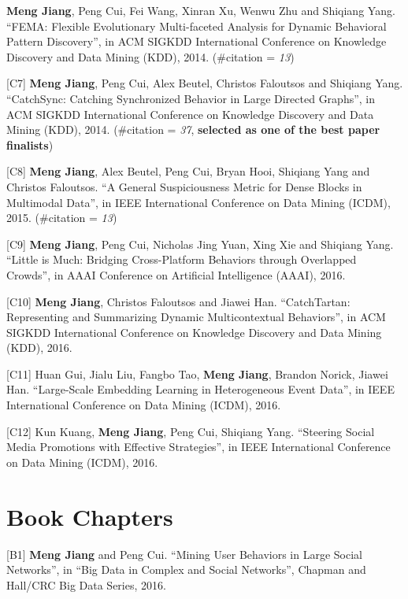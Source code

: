 \documentclass[margin, 10pt]{res}
\begin{document}
\begin{resume}
[C6] \textbf{Meng Jiang}, Peng Cui, Fei Wang, Xinran Xu, Wenwu Zhu and Shiqiang Yang. ``FEMA: Flexible Evolutionary Multi-faceted Analysis for Dynamic Behavioral Pattern Discovery'', in ACM SIGKDD International Conference on Knowledge Discovery and Data Mining (KDD), 2014. (\#citation = \textit{13})

[C7] \textbf{Meng Jiang}, Peng Cui, Alex Beutel, Christos Faloutsos and Shiqiang Yang. ``CatchSync: Catching Synchronized Behavior in Large Directed Graphs'', in ACM SIGKDD International Conference on Knowledge Discovery and Data Mining (KDD), 2014. (\#citation = \textit{37}, \textbf{selected as one of the best paper finalists})

[C8] \textbf{Meng Jiang}, Alex Beutel, Peng Cui, Bryan Hooi, Shiqiang Yang and Christos Faloutsos. ``A General Suspiciousness Metric for Dense Blocks in Multimodal Data'', in IEEE International Conference on Data Mining (ICDM), 2015. (\#citation = \textit{13})

[C9] \textbf{Meng Jiang}, Peng Cui, Nicholas Jing Yuan, Xing Xie and Shiqiang Yang. ``Little is Much: Bridging Cross-Platform Behaviors through Overlapped Crowds'', in AAAI Conference on Artificial Intelligence (AAAI), 2016.

[C10] \textbf{Meng Jiang}, Christos Faloutsos and Jiawei Han. ``CatchTartan: Representing and Summarizing Dynamic Multicontextual Behaviors'', in ACM SIGKDD International Conference on Knowledge Discovery and Data Mining (KDD), 2016.

[C11] Huan Gui, Jialu Liu, Fangbo Tao, \textbf{Meng Jiang}, Brandon Norick, Jiawei Han. ``Large-Scale Embedding Learning in Heterogeneous Event Data'', in IEEE International Conference on Data Mining (ICDM), 2016.

[C12] Kun Kuang, \textbf{Meng Jiang}, Peng Cui, Shiqiang Yang. ``Steering Social Media Promotions with Effective Strategies'', in IEEE International Conference on Data Mining (ICDM), 2016.


\section{Book Chapters}

[B1] \textbf{Meng Jiang} and Peng Cui. ``Mining User Behaviors in Large Social Networks'', in ``Big Data in Complex and Social Networks'', Chapman and Hall/CRC Big Data Series, 2016.


\end{resume}
\end{document}
